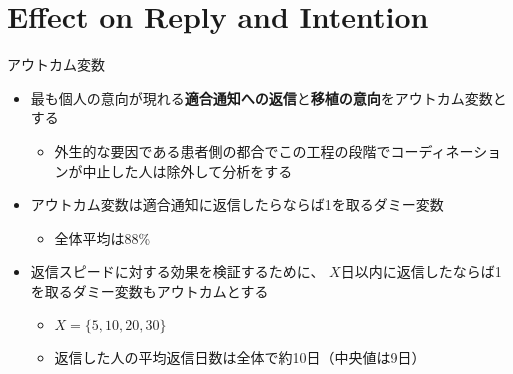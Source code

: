 \documentclass[
      aspectratio=169,
        12pt,
    ]{beamer}
\renewcommand{\textbf}[1]{{\color{DarkBlue}\bfseries#1}}
\providecommand{\tightlist}{%
  \setlength{\itemsep}{0pt}\setlength{\parskip}{0pt}}
\begin{document}
\hypertarget{effect-on-reply-and-intention}{%
\section{Effect on Reply and Intention}\label{effect-on-reply-and-intention}}

\begin{frame}{アウトカム変数}
\protect\hypertarget{ux30a2ux30a6ux30c8ux30abux30e0ux5909ux6570}{}
\begin{itemize}
\tightlist
\item
  最も個人の意向が現れる\textbf{適合通知への返信}と\textbf{移植の意向}をアウトカム変数とする

  \begin{itemize}
  \tightlist
  \item
    外生的な要因である患者側の都合でこの工程の段階でコーディネーションが中止した人は除外して分析をする
  \end{itemize}
\item
  アウトカム変数は適合通知に返信したらならば1を取るダミー変数

  \begin{itemize}
  \tightlist
  \item
    全体平均は88\%
  \end{itemize}
\item
  返信スピードに対する効果を検証するために、
  \(X\)日以内に返信したならば1を取るダミー変数もアウトカムとする

  \begin{itemize}
  \tightlist
  \item
    \(X = \{5, 10, 20, 30\}\)
  \item
    返信した人の平均返信日数は全体で約10日（中央値は9日）
  \end{itemize}
\end{itemize}
\end{frame}
\end{document}
